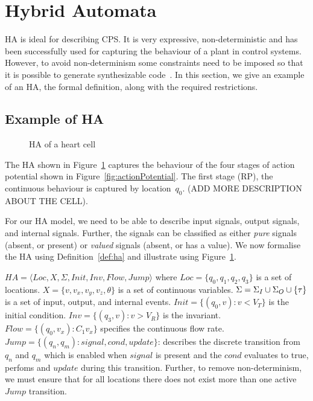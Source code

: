 \section{Hybrid Automata}
\label{sec:HA}



\acf{HA} is ideal for describing 
\ac{CPS}. It is very expressive, non-deterministic  
and has been successfully used for 
capturing the behaviour of a plant in control systems.
However, to avoid non-determinism 
some constraints need to be imposed so that it is possible to  
generate synthesizable code~\cite{Lee2014}. 
In this section, we give an example of an \ac{HA}, the formal definition, along with the required restrictions.




\subsection{Example of \acf{HA} }

\begin{figure}
\centering

\caption{\acf{HA} of a heart cell \label{fig:heartCellHA}}
\end{figure}

The HA shown in Figure~\ref{fig:heartCellHA} captures the 
behaviour of the four stages of action potential  shown in Figure~\ref{fig:actionPotential}.
The first stage (\ac{RP}), the continuous behaviour is captured 
by location~$q_0$. (ADD MORE DESCRIPTION ABOUT THE CELL).

For our \ac{HA} model, we need to be able to 
describe  input signals, 
output signals, 
and internal signals. 
Further,
the signals can be classified as either 
\emph{pure} signals (absent, or present) or
\emph{valued} signals (absent, or has a value).
We now formalise
the \ac{HA} using Definition~\ref{def:ha} 
and illustrate using Figure~\ref{fig:heartCellHA}.\newline



\begin{definition}
	\label{def:ha}
	 $HA = \langle Loc, X, \Sigma, Init, Inv, Flow, Jump \rangle$ where
	$Loc=\{q_0,q_1,q_2,q_3\}$ is a set of locations.
	$X=\{v,v_x,v_y,v_z,\theta\}$ is a set of continuous variables.
	$\Sigma=\Sigma_I \cup \Sigma_O \cup \{\tau\}$ is a set of
	 input, output, and internal events.
	$Init=\{(q_0,v): v < V_T\}$ is the initial condition.
	$Inv=\{(q_3,v): v > V_R\}$ is the invariant.
	$Flow=\{(q_0,v_x): C_1 v_x\}$ specifies the continuous flow rate.
	$Jump=\{(q_n, q_m): signal, cond, update\}$: describes the discrete
	transition from $q_n$ and $q_m$ which is enabled when $signal$ is 
	present and the $cond$ evaluates to true, perfoms and $update$
	during this transition.
	Further, to remove non-determinism, we must ensure that
	for all locations there does not exist more than one 
	active $Jump$ transition.
\end{definition}

